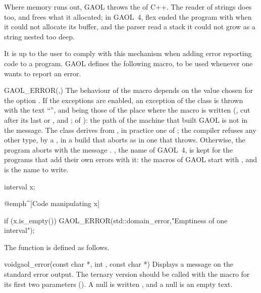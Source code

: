\medskip
Where memory runs out, GAOL throws the  of C++. The
reader of strings does too, and frees what it allocated; in GAOL~4, flex ended the program with  when it could not allocate its buffer, and the parser read a stack it could not grow as a string nested too deep.\newinvfive

\medskip
It is up to the user to comply with this mechanism when adding error
reporting code to a program. GAOL defines the following macro, to be used
whenever one wants to report an error.

\begin{defmacroA}{GAOL\_ERROR}{(,)}
  The behaviour of the macro depends on the value chosen for the option
  . If the exceptions are enabled, an exception of
  the class  is thrown with the text
  ``'',  and  being those of
  the place where the macro is written (, cut after its last
  \code{/} or \code{\textbackslash}, and ; 
  of ): the path of the machine that built GAOL is not
  in the message. The class  derives from ,
  in practice one of ; the compiler refuses any other type,
  by a , in a build that aborts as in one that throws.
  Otherwise, the program aborts with the message . ,
  the name of GAOL~4, is kept for the programs that add their own errors with
  it: the macros of GAOL start with , and  is the
  name to write.\newinvfive

\begin{example}
interval x;

@emph^[Code manipulating x]~

if (x.is_empty()) {
   GAOL_ERROR(std::domain_error,"Emptiness of one interval");
}
\end{example}
\end{defmacroA}

The function  is defined as follows.

\begin{deffun}{void}{gaol\_error}{(const char *, int ,
const char *)}
Displays a message on the standard error output. The ternary version should
be called with the macro  for its first two parameters
(). A null  is written
, and a null  is an empty text.\newinvfive
\end{deffun}

